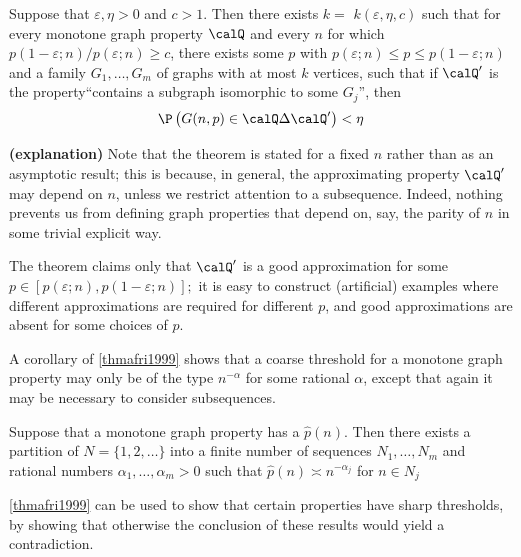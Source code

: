 \documentclass{article}
\newcommand{\bfs}[1]{\textbf{({#1}) }}
\begin{document}
\begin{thma}\label{thmafri1999}
Suppose that $\varepsilon, \eta>0$ and $c>1 .$ Then there exists $k=$ $k(\varepsilon, \eta, c)$ such that for every monotone graph property $\calQ$ and every $n$ for which $p(1-\varepsilon ; n) / p(\varepsilon ; n) \geq c$, there exists some $p$ with $p(\varepsilon ; n) \leq p \leq p(1-\varepsilon ; n)$
and a family $G_{1}, \ldots, G_{m}$ of graphs with at most $k$ vertices, such that if $\calQ ^{\prime}$ is the property``contains a subgraph isomorphic to some $G_{j}$'', then
\begin{align*}
\P \left( G (n, p) \in \calQ \Delta \calQ ^{\prime}\right)<\eta
\end{align*}
\end{thma}

\begin{rema}{\bfs{explanation}}
Note that the theorem is stated for a fixed $n$ rather than as an asymptotic result; this is because, in general, the approximating property $\calQ ^{\prime}$ may depend on $n$, unless we restrict attention to a subsequence. Indeed, nothing prevents us from defining graph properties that depend on, say, the parity of $n$ in some trivial explicit way.

The theorem claims only that $\calQ ^{\prime}$ is a good approximation for some $p \in[p(\varepsilon ; n), p(1-\varepsilon ; n)] ;$ it is easy to construct (artificial) examples where different approximations are required for different $p$, and good approximations are absent for some choices of $p$.
\end{rema}


A corollary of \cref{thmafri1999}  shows that a coarse threshold for a monotone graph property may only be of the type $n^{-\alpha}$ for some rational $\alpha$, except that again it may be necessary to consider subsequences.

\begin{thma}
Suppose that a monotone graph property has a  $\widehat{p}(n) .$ Then there exists a partition of $N =\{1,2, \ldots\}$ into a finite number of sequences $N _{1}, \ldots, N _{m}$ and rational numbers $\alpha_{1}, \ldots, \alpha_{m}>0$ such that $\widehat{p}(n) \asymp n^{-\alpha_{j}}$ for $n \in N _{j}$
\end{thma} 
\begin{rema}
\cref{thmafri1999} can be used to show that certain properties have sharp thresholds, by showing that otherwise the conclusion of these results would yield a contradiction.
\end{rema}
\end{document}
